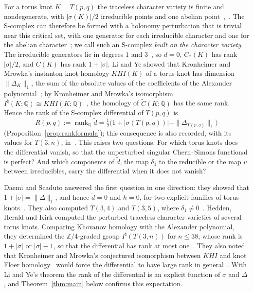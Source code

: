 \documentclass[11pt,reqno]{amsart}
\theoremstyle{plain}
\theoremstyle{definition}
\newcommand{\Z}{\mathbb{Z}}
\newcommand{\Q}{\mathbb{Q}}
\newcommand{\Inat}{I^{\natural}}
\newcommand{\td}{\widetilde d}
\newcommand{\tC}{\widetilde C}
\begin{document}
For a torus knot $K=T(p,q)$ the traceless character variety is finite and nondegenerate, with
$|\sigma(K)|/2$ irreducible points and one abelian point~\cite[\S5.1]{HHK1},~\cite[\S9.5]{DSEquiv}. The
S-complex can therefore be formed with a holonomy perturbation that is trivial near this critical set,
with one generator for each irreducible character and one for the abelian character~\cite[\S4.5, proof
of Thm.~4]{DScaduto}; we call such an S-complex \emph{built on the character variety}. The irreducible
generators lie in degrees $1$ and $3$~\cite[\S1, Cor.~3 and its proof]{DScaduto}, so $d=0$, $C_*(K)$ has
rank $|\sigma|/2$, and $\tC(K)$ has rank $1+|\sigma|$. Li and Ye showed that Kronheimer and Mrowka's
instanton knot homology $KHI(K)$ of a torus knot has dimension $\|\Delta_K\|_1$, the sum of the absolute
values of the coefficients of the Alexander polynomial~\cite[Cor.~1.8]{LiYe}; by Kronheimer and Mrowka's
isomorphism $\Inat(K;\Q)\cong KHI(K;\Q)$~\cite[Prop.~1.4]{KM2}, the homology of $\tC(K;\Q)$ has the same
rank. Hence the
rank of the S-complex differential of $T(p,q)$ is
\[
R(p,q):=\operatorname{rank}_\Q\td=\tfrac12\bigl(1+|\sigma(T(p,q))|-\|\Delta_{T(p,q)}\|_1\bigr)
\]
(Proposition~\ref{prop:rankformula}); this consequence is also recorded, with its values for $T(3,n)$,
in~\cite[Cor.~1.4]{WuebbenI}. This raises two questions. For which torus knots does the
differential vanish, so that the unperturbed singular Chern--Simons functional is perfect? And which
components of $\td$, the map $\delta_1$ to the reducible or the map $v$ between irreducibles, carry the
differential when it does not vanish?

Daemi and Scaduto answered the first question in one direction: they showed that $1+|\sigma|=\|\Delta\|_1$,
and hence $\td=0$ and $h=0$, for two explicit families of torus knots~\cite[(9.36), Prop.~9.37]{DSEquiv}. They also computed $T(3,4)$ and $T(3,5)$, where
$\delta_1\neq0$~\cite[\S\S9.3--9.4]{DSEquiv}. Hedden, Herald and Kirk computed the perturbed traceless
character varieties of several torus knots. Comparing Khovanov homology with the Alexander polynomial,
they determined the $\Z/4$-graded group $\Inat(T(3,n))$ for $n\le38$, whose rank is $1+|\sigma|$ or
$|\sigma|-1$, so that the differential has rank at most one~\cite[\S12.4]{HHK1}. They also noted that
Kronheimer and Mrowka's conjectured isomorphism between $KHI$ and knot Floer homology~\cite[Conj.~7.25]{KMsut}
would force the differential to have large rank in general~\cite[\S12.6]{HHK1}. With Li and Ye's theorem the rank of the differential is
an explicit function of $\sigma$ and $\Delta$, and Theorem~\ref{thm:main} below confirms this expectation.
\end{document}
